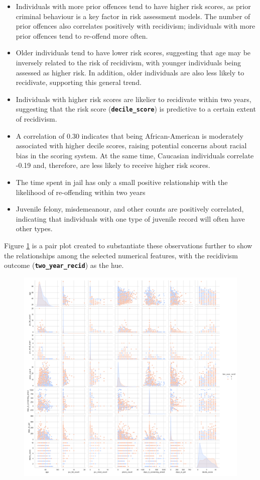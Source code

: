 \documentclass[conference]{IEEEtran}
\begin{document}
	
	\begin{itemize}
		\item Individuals with more prior offences tend to have higher risk scores, as prior criminal behaviour is a key factor in risk assessment models. The number of prior offences also correlates positively with recidivism; individuals with more prior offences tend to re-offend more often.
		
		\item Older individuals tend to have lower risk scores, suggesting that age may be inversely related to the risk of recidivism, with younger individuals being assessed as higher risk. In addition, older individuals are also less likely to recidivate, supporting this general trend.
		
		\item Individuals with higher risk scores are likelier to recidivate within two years, suggesting that the risk score (\textbf{\texttt{decile\_score}}) is predictive to a certain extent of recidivism.
		
		\item A correlation of 0.30 indicates that being African-American is moderately associated with higher decile scores, raising potential concerns about racial bias in the scoring system. At the same time, Caucasian individuals correlate -0.19 and, therefore, are less likely to receive higher risk scores.
		
		\item The time spent in jail has only a small positive relationship with the likelihood of re-offending within two years
		
		\item  Juvenile felony, misdemeanour, and other counts are positively correlated, indicating that individuals with one type of juvenile record will often have other types.
	\end{itemize}
	
	Figure \ref{fig:pairplot} is a pair plot created to substantiate these observations further to show the relationships among the selected numerical features, with the recidivism outcome (\textbf{\texttt{two\_year\_recid}}) as the hue.
	
	\begin{figure}
		\centering
		\includegraphics[width=0.7\linewidth]{img/pair_plot}
		\caption{}
		\label{fig:pairplot}
	\end{figure}
	
\end{document}
